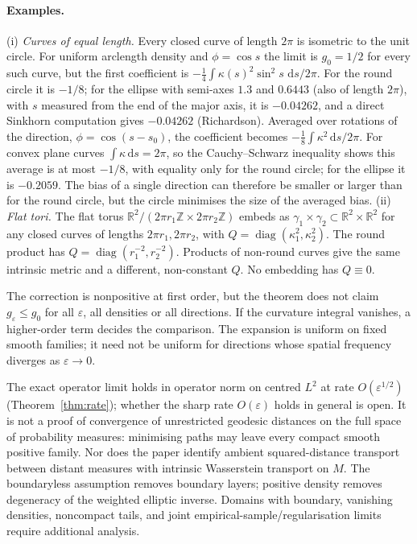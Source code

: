 \documentclass[11pt,a4paper]{article}
\theoremstyle{definition}\newtheorem{definition}[theorem]{Definition}
\theoremstyle{remark}\newtheorem{remark}[theorem]{Remark}
\newcommand{\eps}{\varepsilon}
\newcommand{\dd}{\,\mathrm d}
\newcommand{\R}{\mathbb R}
\begin{document}
\paragraph{Examples.} (i) \emph{Curves of equal length.} Every closed curve of length $2\pi$ is isometric to the unit circle. For uniform arclength density and $\phi=\cos s$ the limit is $g_0=1/2$ for every such curve, but the first coefficient is $-\tfrac14\int\kappa(s)^2\sin^2s\,\dd s/2\pi$. For the round circle it is $-1/8$; for the ellipse with semi-axes $1.3$ and $0.6443$ (also of length $2\pi$), with $s$ measured from the end of the major axis, it is $-0.04262$, and a direct Sinkhorn computation gives $-0.04262$ (Richardson). Averaged over rotations of the direction, $\phi=\cos(s-s_0)$, the coefficient becomes $-\tfrac18\int\kappa^2\dd s/2\pi$. For convex plane curves $\int\kappa\dd s=2\pi$, so the Cauchy--Schwarz inequality shows this average is at most $-1/8$, with equality only for the round circle; for the ellipse it is $-0.2059$. The bias of a single direction can therefore be smaller or larger than for the round circle, but the circle minimises the size of the averaged bias. (ii) \emph{Flat tori.} The flat torus $\R^2/(2\pi r_1\mathbb Z\times2\pi r_2\mathbb Z)$ embeds as $\gamma_1\times\gamma_2\subset\R^2\times\R^2$ for any closed curves of lengths $2\pi r_1,2\pi r_2$, with $Q=\operatorname{diag}(\kappa_1^2,\kappa_2^2)$. The round product has $Q=\operatorname{diag}(r_1^{-2},r_2^{-2})$. Products of non-round curves give the same intrinsic metric and a different, non-constant $Q$. No embedding has $Q\equiv0$.

The correction is nonpositive at first order, but the theorem does not claim $g_\eps\leq g_0$ for all $\eps$, all densities or all directions. If the curvature integral vanishes, a higher-order term decides the comparison. The expansion is uniform on fixed smooth families; it need not be uniform for directions whose spatial frequency diverges as $\eps\to0$.

The exact operator limit holds in operator norm on centred $L^2$ at rate $O(\eps^{1/2})$ (Theorem~\ref{thm:rate}); whether the sharp rate $O(\eps)$ holds in general is open. It is not a proof of convergence of unrestricted geodesic distances on the full space of probability measures: minimising paths may leave every compact smooth positive family. Nor does the paper identify ambient squared-distance transport between distant measures with intrinsic Wasserstein transport on $M$. The boundaryless assumption removes boundary layers; positive density removes degeneracy of the weighted elliptic inverse. Domains with boundary, vanishing densities, noncompact tails, and joint empirical-sample/regularisation limits require additional analysis.
\end{document}

